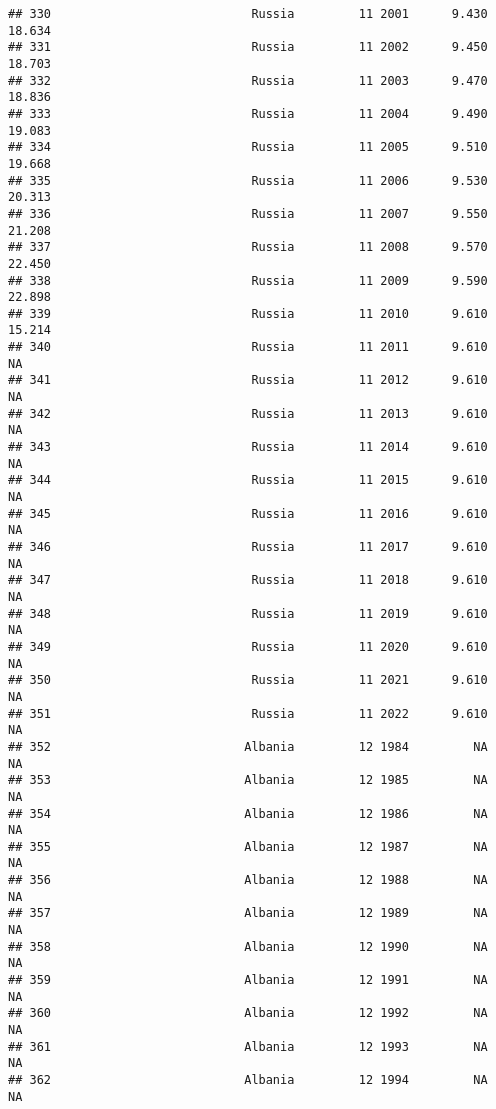 \documentclass[
]{article}
\begin{document}
\begin{verbatim}
## 330                            Russia         11 2001      9.430     18.634
## 331                            Russia         11 2002      9.450     18.703
## 332                            Russia         11 2003      9.470     18.836
## 333                            Russia         11 2004      9.490     19.083
## 334                            Russia         11 2005      9.510     19.668
## 335                            Russia         11 2006      9.530     20.313
## 336                            Russia         11 2007      9.550     21.208
## 337                            Russia         11 2008      9.570     22.450
## 338                            Russia         11 2009      9.590     22.898
## 339                            Russia         11 2010      9.610     15.214
## 340                            Russia         11 2011      9.610         NA
## 341                            Russia         11 2012      9.610         NA
## 342                            Russia         11 2013      9.610         NA
## 343                            Russia         11 2014      9.610         NA
## 344                            Russia         11 2015      9.610         NA
## 345                            Russia         11 2016      9.610         NA
## 346                            Russia         11 2017      9.610         NA
## 347                            Russia         11 2018      9.610         NA
## 348                            Russia         11 2019      9.610         NA
## 349                            Russia         11 2020      9.610         NA
## 350                            Russia         11 2021      9.610         NA
## 351                            Russia         11 2022      9.610         NA
## 352                           Albania         12 1984         NA         NA
## 353                           Albania         12 1985         NA         NA
## 354                           Albania         12 1986         NA         NA
## 355                           Albania         12 1987         NA         NA
## 356                           Albania         12 1988         NA         NA
## 357                           Albania         12 1989         NA         NA
## 358                           Albania         12 1990         NA         NA
## 359                           Albania         12 1991         NA         NA
## 360                           Albania         12 1992         NA         NA
## 361                           Albania         12 1993         NA         NA
## 362                           Albania         12 1994         NA         NA

\end{verbatim}
\end{document}
